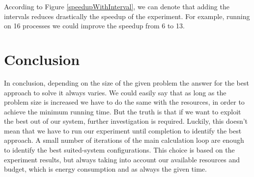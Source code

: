 \documentclass[12pt,a4paper]{article}
\newcommand{\sectionVspacing}{\vspace{15pt}}
\begin{document}
According to Figure \ref{speedupWithInterval}, we can denote that adding the intervals reduces drastically the speedup of the experiment. For example, running on 16 processes we could improve the speedup from 6 to 13.

\sectionVspacing

\section{Conclusion}
	In conclusion, depending on the size of the given problem the answer for the best approach to solve it always varies. We could easily say that as long as the problem size is increased we have to do the same with the resources, in order to achieve the minimum running time. But the truth is that if we want to exploit the best out of our system, further investigation is required. Luckily, this doesn't mean that we have to run our experiment until completion to identify the best approach. A small number of iterations of the main calculation loop are enough to identify the best suited-system configurations. This choice is based on the experiment results, but always taking into account our available resources and budget, which is energy consumption and as always the given time.
\end{document}
